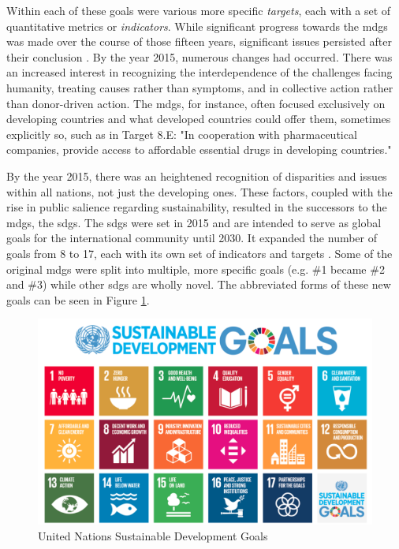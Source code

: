 Within each of these goals were various more specific \textit{targets}, each with a set of quantitative metrics or \textit{indicators}. While significant progress towards the \acp{mdg} was made over the course of those fifteen years, significant issues persisted after their conclusion \cite{inter-agencyandexpertgrouponmdgindicatorsMillenniumDevelopmentGoals2015}. By the year 2015, numerous changes had occurred. There was an increased interest in recognizing the interdependence of the challenges facing humanity, treating causes rather than symptoms, and in collective action rather than donor-driven action. The \acp{mdg}, for instance, often focused exclusively on developing countries and what developed countries could offer them, sometimes explicitly so, such as in Target 8.E: "In cooperation with pharmaceutical companies, provide access to affordable essential drugs in developing countries." 

By the year 2015, there was an heightened recognition of disparities and issues within all nations, not just the developing ones. These factors, coupled with the rise in public salience regarding sustainability, resulted in the successors to the \acp{mdg}, the \acp{sdg}. The \acp{sdg} were set in 2015 and are intended to serve as global goals for the international community until 2030. It expanded the number of goals from 8 to 17, each with its own set of indicators and targets \cite{unitednationsTransformingOurWorld2015}. Some of the original \acp{mdg} were split into multiple, more specific goals (e.g. \#1 became \#2 and \#3) while other \acp{sdg} are wholly novel. The abbreviated forms of these new goals can be seen in Figure \ref{fig:sdgs}.

\begin{figure}[h]
	\centering
	\includegraphics[scale=0.25]{Figures/chap2/SDG.png}
	\caption[United Nations Sustainable Development Goals]{United Nations Sustainable Development Goals}
	\label{fig:sdgs}
\end{figure}


